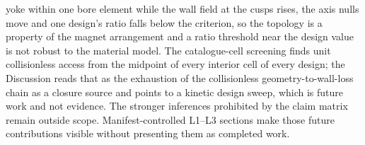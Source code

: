 \documentclass[11pt]{article}
\begin{document}
yoke within one bore element while the wall field at the cusps rises, the axis
nulls move and one design's ratio falls below the criterion, so the topology is a
property of the magnet arrangement and a ratio threshold near the design value is
not robust to the material model.
The catalogue-cell screening finds unit collisionless access from the midpoint of
every interior cell of every design; the Discussion reads that as the exhaustion
of the collisionless geometry-to-wall-loss chain as a closure source and points
to a kinetic design sweep, which is future work and not evidence.
The stronger inferences prohibited by the claim matrix remain outside scope.
Manifest-controlled L1--L3 sections make those future contributions visible
without presenting them as completed work.



\end{document}
